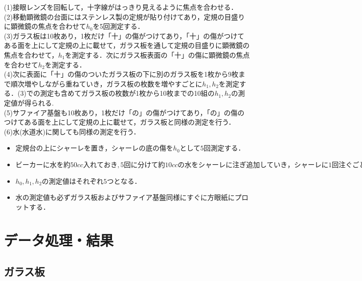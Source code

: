\documentclass[a4paper,1pt]{jsarticle}
\begin{document}
(1)接眼レンズを回転して，十字線がはっきり見えるように焦点を合わせる．\\

(2)移動顕微鏡の台面にはステンレス製の定規が貼り付けてあり，定規の目盛りに顕微鏡の焦点を合わせて$h_0$を5回測定する．\\

(3)ガラス板は10枚あり，1枚だけ「十」の傷がつけてあり，「十」の傷がつけてある面を上にして定規の上に載せて，ガラス板を通して定規の目盛りに顕微鏡の焦点を合わせて，$h_1$を測定する．次にガラス板表面の「十」の傷に顕微鏡の焦点を合わせて$h_2$を測定する．\\

(4)次に表面に「十」の傷のついたガラス板の下に別のガラス板を1枚から9枚まで順次増やしながら重ねていき，ガラス板の枚数を増やすごとに$h_1,h_2$を測定する．(3)での測定も含めてガラス板の枚数が1枚から10枚までの10組の$h_1,h_2$の測定値が得られる.\\

(5)サファイア基盤も10枚あり，1枚だけ「の」の傷がつけてあり，「の」の傷のつけてある面を上にして定規の上に載せて，ガラス板と同様の測定を行う．\\

(6)水(水道水)に関しても同様の測定を行う．

\begin{itemize}
  \item $定規台の上にシャーレを置き，シャーレの底の傷をh_0として5回測定する．$
  \item $ビーカーに水を約50cc入れておき,5回に分けて約10ccの水をシャーレに注ぎ追加していき，シャーレに1回注ぐごとに水を透してシャーレの底の傷に顕微鏡の焦点を合わせてh_1を測定し，水面にコルク細粉を浮遊させて，それに顕微鏡の焦点を合わせてh_2を測定する．$
  \item $h_0,h_1,h_2の測定値はそれぞれ5つとなる．$
  \item 水の測定値も必ずガラス板およびサファイア基盤同様にすぐに方眼紙にプロットする．
\end{itemize}




\section{データ処理・結果}

\subsection[short]{ガラス板}
\end{document}
